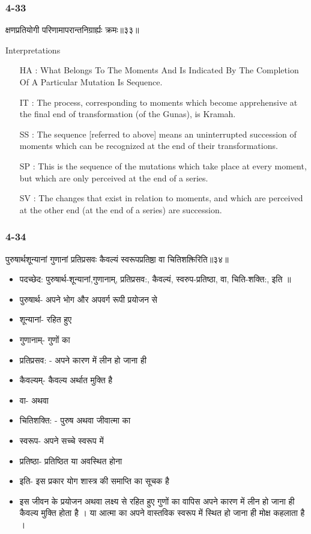 \begin{frame}[fragile]\frametitle{4-33}
\begin{sanskrit}
क्षणप्रतियोगी परिणामापरान्तनिग्रार्ह्यः क्रमः॥३३॥
\end{sanskrit}

Interpretations
\begin{itemize}	
\item [HA]: What Belongs To The Moments And Is Indicated By The Completion Of A Particular Mutation Is Sequence.
\item [IT]: The process, corresponding to moments which become apprehensive at the final end of transformation (of the Gunas), is Kramah.
\item [SS]: The sequence [referred to above] means an uninterrupted succession of moments which can be recognized at the end of their transformations.
\item [SP]: This is the sequence of the mutations which take place at every moment, but which are only perceived at the end of a series.
\item [SV]: The changes that exist in relation to moments, and which are perceived at the other end (at the end of a series) are succession. 
\end{itemize}
\end{frame}

\begin{frame}[fragile]\frametitle{4-34}
\begin{sanskrit}
पुरुषार्थशून्यानां गुणानां प्रतिप्रसवः कैवल्यं स्वरूपप्रतिष्ठा वा चितिशक्तिरिति॥३४॥
\end{sanskrit}

	\begin{itemize}
	\item पदच्छेद:  पुरुषार्थ-शून्यानां,गुणानाम्, प्रतिप्रसव:, कैवल्यं, स्वरुप-प्रतिष्ठा, वा, चिति-शक्ति:, इति ‌॥
	\item पुरुषार्थ- अपने भोग और अपवर्ग रूपी प्रयोजन से
	\item शून्यानां- रहित हुए
	\item गुणानाम्- गुणों का
	\item प्रतिप्रसव: - अपने कारण में लीन हो जाना ही
	\item कैवल्यम्- कैवल्य अर्थात मुक्ति है
	\item वा- अथवा
	\item चितिशक्ति: - पुरुष अथवा जीवात्मा का
	\item स्वरूप- अपने सच्चे स्वरूप में
	\item प्रतिष्ठा- प्रतिष्ठित या अवस्थित होना
	\item इति- इस प्रकार योग शास्त्र की समाप्ति का सूचक है	
	\item इस जीवन के प्रयोजन अथवा लक्ष्य से रहित हुए गुणों का वापिस अपने कारण में लीन हो जाना ही कैवल्य मुक्ति होता है । या आत्मा का अपने वास्तविक स्वरूप में स्थित हो जाना ही मोक्ष कहलाता है ।
	\end{itemize}
\end{frame}


